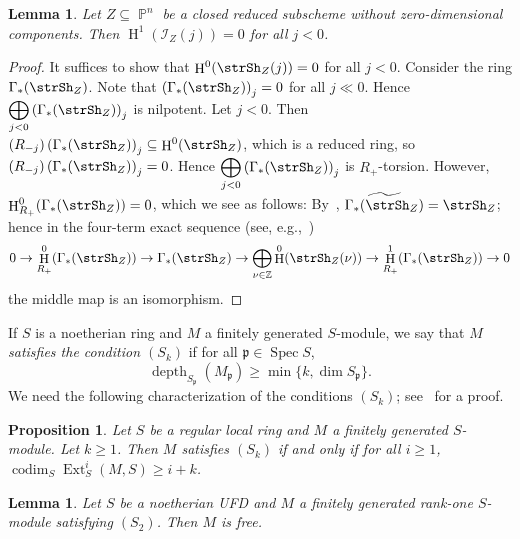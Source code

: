 \documentclass[11pt,a4paper]{amsart}
\theoremstyle{plain}
\newtheorem{lemma}[equation]{Lemma}
\newtheorem{proposition}[equation]{Proposition}
\theoremstyle{definition}
\newcommand{\calI}{\mathcal I}
\newcommand{\frakp}{{\mathfrak p}}
\newcommand{\ints}{\mathbb{Z}}
\DeclareMathOperator{\projective}{\mathbb{P}}
\DeclareMathOperator{\codim}{codim}
\DeclareMathOperator{\Spec}{Spec}
\DeclareMathOperator{\depth}{depth}
\DeclareMathOperator{\homology}{H}
\newcommand{\define}[1]{\emph{#1}}
\DeclareMathOperator{\Ext}{Ext}
\begin{document}
\begin{lemma}
\label{lemma:RedNoSecNeg}
Let $Z \subseteq \projective^n$ be a closed reduced subscheme without
zero-dimensional components.
Then $\homology^1(\calI_Z(j)) = 0$ for all $j < 0$.
\end{lemma}

\begin{proof}
%
It suffices to show that 
$\homology^0(\strSh_Z(j)) = 0$ for all $j < 0$.
Consider the ring $\Gamma_*(\strSh_Z)$.
Note that 
$\displaystyle \left(\Gamma_*(\strSh_Z)\right)_j = 0$ for all $j \ll 0$. Hence 
$\displaystyle \bigoplus_{j<0} \left(\Gamma_*(\strSh_Z)\right)_j$ is
nilpotent.
Let $j<0$. Then $(R_{- j}) \left(\Gamma_*(\strSh_Z)\right)_j \subseteq 
\homology^0(\strSh_Z)$, which is a reduced ring, so 
$(R_{- j}) \left(\Gamma_*(\strSh_Z)\right)_j=0$. Hence
$\displaystyle \bigoplus_{j<0} \left(\Gamma_*(\strSh_Z)\right)_j$ is
$R_+$-torsion. However, 
$\homology^0_{R_+}(\Gamma_*(\strSh_Z)) = 0$, which we see as follows:
By~\cite[Chapter~II, Proposition~5.15]{HartAG}, 
%
$\widetilde{\Gamma_*(\strSh_Z)} = \strSh_Z$; hence in the four-term exact
sequence (see, e.g.,~\cite[Theorem~A4.1]{eiscommalg})
\[
0 \to 
\homology^0_{R_+}(\Gamma_*(\strSh_Z))
\to
\Gamma_*(\strSh_Z)
\to
\bigoplus_{\nu \in \ints}\homology^0(\strSh_Z(\nu))
\to
\homology^1_{R_+}(\Gamma_*(\strSh_Z)) \to 0
\]
the middle map is an isomorphism.
\end{proof}

If $S$ is a noetherian ring and $M$ a finitely generated $S$-module, we say
that $M$ \define{satisfies the condition $(S_k)$} if for all $\frakp \in
\Spec S$, 
\[
\depth_{S_\frakp}(M_\frakp) \geq \min \{k, \dim S_\frakp\}.
\]
We need the following characterization of the conditions $(S_k)$;
see~\cite[\S 1.2]{SchenzelUseLC1998} for a proof.

\begin{proposition}
\label{proposition:SkAndExt}
Let $S$ be a regular local ring and $M$ a finitely generated $S$-module.
Let $k \geq 1$.
Then $M$ satisfies $(S_k)$ if and only if for all $i \geq 1$, $\codim_S
\Ext_S^i(M,S ) \geq i+k$.
\end{proposition}

\begin{lemma}
\label{lemma:S2UFDfree}
Let $S$ be a noetherian UFD and $M$ a finitely generated rank-one
$S$-module satisfying $(S_2)$. 
Then $M$ is free.
\end{lemma}
\end{document}
